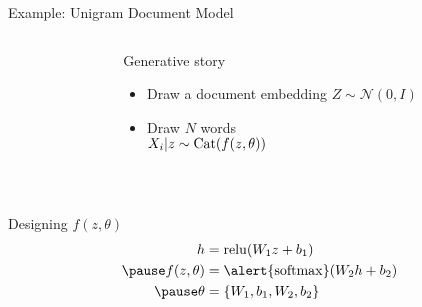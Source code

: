 \documentclass[14pt]{beamer}
\begin{document}
\begin{frame}{Example: Unigram Document Model}


\begin{columns}
	\begin{column}{0.2\textwidth}
    \end{column}
    \begin{column}{0.75\textwidth}
    	Generative story 
    	\begin{itemize}
			\item Draw a document embedding $Z \sim \mathcal N(0, I)$
			\item Draw $N$ words\\
			$X_i|z \sim \operatorname{Cat}(f(z, \theta))$
		\end{itemize}
    \end{column}
    \end{columns}
    \pause
    
    ~
    
    Designing $f(z, \theta)$    \pause
    \begin{equation*}
	\begin{aligned}						
		h &= \relu(W_1z+b_1) \\ \pause
		f(z, \theta) &= \alert{\softmax}(W_2h + b_2) \\		\pause
		\theta &= \{W_1, b_1, W_2, b_2\}
	\end{aligned}
	\end{equation*}
	

\end{frame}
\end{document}
